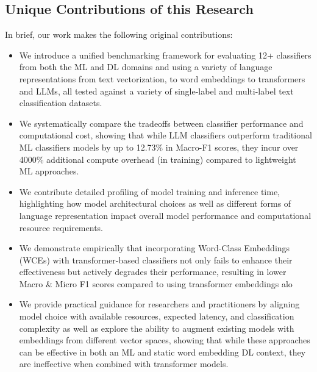 \documentclass[final]{clv2025}
\begin{document}
\subsection{Unique Contributions of this Research}

In brief, our work makes the following original contributions:

\begin{itemize}

\item We introduce a unified benchmarking framework for evaluating 12+ classifiers from both the ML and DL domains and using a variety of language representations from text vectorization, to word embeddings to transformers and LLMs, all tested against a variety of single-label and multi-label text classification datasets.
\item We systematically compare the tradeoffs between classifier performance and computational cost, showing that while LLM classifiers outperform traditional ML classifiers models by up to 12.73\% in Macro-F1 scores, they incur over 4000\% additional compute overhead (in training) compared to lightweight ML approaches.
\item We contribute detailed profiling of model training and inference time, highlighting how model architectural choices as well as different forms of language representation impact overall model performance and computational resource requirements.
\item We demonstrate empirically that incorporating Word-Class Embeddings (WCEs) with transformer-based classifiers not only fails to enhance their effectiveness but actively degrades their performance, resulting in lower Macro \& Micro F1 scores compared to using transformer embeddings alo
\item We provide practical guidance for researchers and practitioners by aligning model choice with available resources, expected latency, and classification complexity as well as explore the ability to augment existing models with embeddings from different vector spaces, showing that while these approaches can be effective in both an ML and static word embedding DL context, they are ineffective when combined with transformer models.
\end{itemize}
\end{document}
